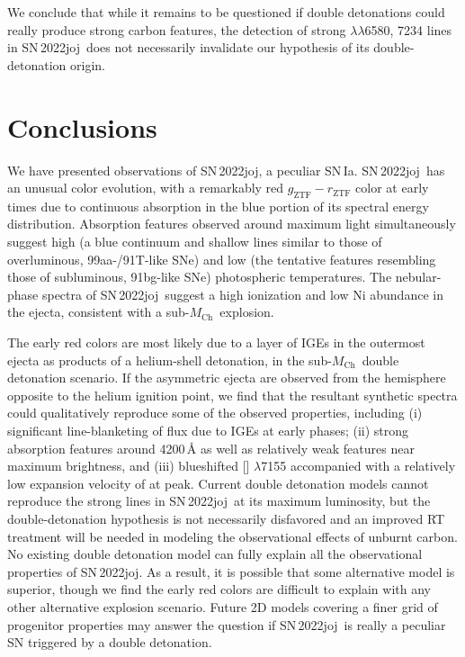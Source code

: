 \documentclass[twocolumn]{aastex631}
\newcommand{\sn}{SN\,2022joj}
\newcommand{\Mch}{$M_\mathrm{Ch}$}
\begin{document}
\begin{CJK*}{UTF8}{gbsn}
We conclude that while it remains to be questioned if double detonations could really produce strong carbon features, the detection of strong  $\lambda\lambda$6580, 7234 lines in \sn\ does not necessarily invalidate our hypothesis of its double-detonation origin.


\section{Conclusions} \label{sec:conclusion}
We have presented observations of \sn, a peculiar SN\,Ia. \sn\ has an unusual color evolution, with a remarkably red $g_\mathrm{ZTF}-r_\mathrm{ZTF}$ color at early times due to continuous absorption in the blue portion of its spectral energy distribution. Absorption features observed around maximum light simultaneously suggest high (a blue continuum and shallow  lines similar to those of overluminous, 99aa-/91T-like SNe) and low (the tentative  features resembling those of subluminous, 91bg-like SNe) photospheric temperatures. The nebular-phase spectra of \sn\ suggest a high ionization and low Ni abundance in the ejecta, consistent with a sub-\Mch\ explosion.

The early red colors are most likely due to a layer of IGEs in the outermost ejecta as products of a helium-shell detonation, in the sub-\Mch\ double detonation scenario. If the asymmetric ejecta are observed from the hemisphere opposite to the helium ignition point, we find that the resultant synthetic spectra could qualitatively reproduce some of the observed properties, including (i) significant line-blanketing of flux due to IGEs at early phases; (ii) strong absorption features around 4200\,\r{A} as well as relatively weak  features near maximum brightness, and (iii) blueshifted [] $\lambda$7155 accompanied with a relatively low expansion velocity of  at peak. Current double detonation models cannot reproduce the strong  lines in \sn\ at its maximum luminosity, but the double-detonation hypothesis is not necessarily disfavored and an improved RT treatment will be needed in modeling the observational effects of unburnt carbon.
No existing double detonation model can fully explain all the observational properties of \sn. As a result, it is possible that some alternative model is superior, though we find the early red colors are difficult to explain with any other alternative explosion scenario. Future 2D models covering a finer grid of progenitor properties may answer the question if \sn\ is really a peculiar SN triggered by a double detonation.\\


\end{CJK*}
\end{document}
